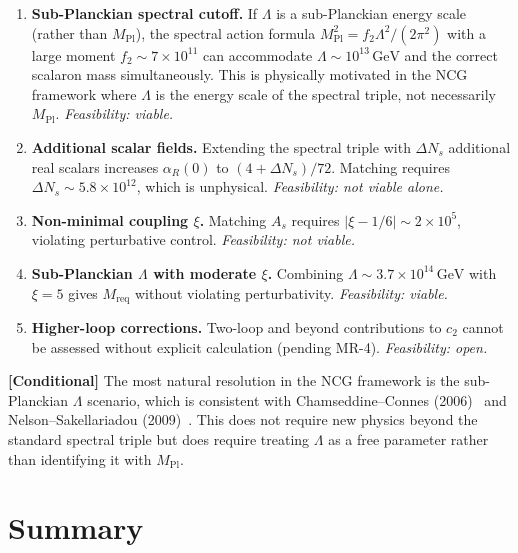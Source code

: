 \documentclass[11pt,a4paper]{article}
\theoremstyle{plain}
\theoremstyle{definition}
\newcommand{\conditional}[1]{%
  \par\smallskip\noindent
  \colorbox{yellow!15}{\parbox{\dimexpr\linewidth-2\fboxsep}{%
    \textcolor{orange!60!black}{\textbf{[Conditional]}} #1}}%
  \par\smallskip}
\begin{document}
\begin{enumerate}
  \item \textbf{Sub-Planckian spectral cutoff.}
    If $\Lambda$ is a sub-Planckian energy scale (rather than
    $M_{\mathrm{Pl}}$), the spectral action formula
    $M_{\mathrm{Pl}}^2 = f_2 \Lambda^2 / (2\pi^2)$ with a large
    moment $f_2 \sim 7 \times 10^{11}$ can accommodate
    $\Lambda \sim 10^{13}\,\mathrm{GeV}$ and the correct scalaron mass
    simultaneously.  This is physically motivated in the NCG framework
    where $\Lambda$ is the energy scale of the spectral triple, not
    necessarily $M_{\mathrm{Pl}}$.
    \emph{Feasibility: viable.}

  \item \textbf{Additional scalar fields.}
    Extending the spectral triple with $\Delta N_s$ additional real scalars
    increases $\alpha_R(0)$ to $(4 + \Delta N_s)/72$.  Matching requires
    $\Delta N_s \sim 5.8 \times 10^{12}$, which is unphysical.
    \emph{Feasibility: not viable alone.}

  \item \textbf{Non-minimal coupling $\xi$.}
    Matching $A_s$ requires $|\xi - 1/6| \sim 2 \times 10^5$, violating
    perturbative control.
    \emph{Feasibility: not viable.}

  \item \textbf{Sub-Planckian $\Lambda$ with moderate $\xi$.}
    Combining $\Lambda \sim 3.7 \times 10^{14}\,\mathrm{GeV}$ with
    $\xi = 5$ gives $M_{\mathrm{req}}$ without violating perturbativity.
    \emph{Feasibility: viable.}

  \item \textbf{Higher-loop corrections.}
    Two-loop and beyond contributions to $c_2$ cannot be assessed without
    explicit calculation (pending MR-4).
    \emph{Feasibility: open.}
\end{enumerate}

\conditional{The most natural resolution in the NCG framework is the
sub-Planckian $\Lambda$ scenario, which is consistent with
Chamseddine--Connes (2006)~\cite{CC06} and
Nelson--Sakellariadou (2009)~\cite{NS09}.  This does not require new
physics beyond the standard spectral triple but does require treating
$\Lambda$ as a free parameter rather than identifying it with
$M_{\mathrm{Pl}}$.}

\section{Summary}\label{sec:summary}
\end{document}
